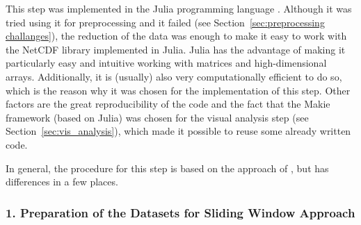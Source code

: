 This step was implemented in the Julia programming language \cite{bezanson_julia_2017}.
Although it was tried using it for preprocessing and it failed (see Section~\ref{sec:preprocessing challanges}), the reduction of the data was enough to make it easy to work with the NetCDF library \cite{barth_ncdatasetsjl_2024} implemented in Julia. 
Julia has the advantage of making it particularly easy and intuitive working with matrices and high-dimensional arrays. 
Additionally, it is (usually) also very computationally efficient to do so, which is the reason why it was chosen for the implementation of this step. 
Other factors are the great reproducibility of the code and the fact that the Makie framework (based on Julia) was chosen for the visual analysis step (see Section~\ref{sec:vis_analysis}), which made it possible to reuse some already written code. 


In general, the procedure for this step is based on the approach of \cite{vietinghoff_visual_2021}, but has differences in a few places. 


\subsubsection{1. Preparation of the Datasets for Sliding Window Approach}

